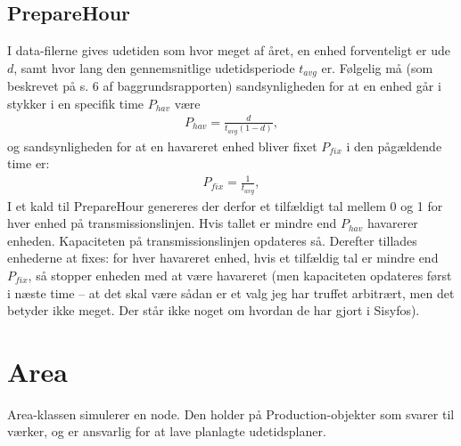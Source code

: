 \documentclass{article}
\begin{document}
\subsection{PrepareHour} \label{sec:prepLine}
I data-filerne gives udetiden som hvor meget af året, en enhed forventeligt er ude $d$, samt hvor lang den gennemsnitlige udetidsperiode $t_{avg}$ er. Følgelig må (som beskrevet på s. 6 af baggrundsrapporten) sandsynligheden for at en enhed går i stykker i en specifik time $P_{hav}$ være
\begin{align}
    P_{hav} = \frac{d}{t_{avg}(1-d)},
\end{align}
og sandsynligheden for at en havareret enhed bliver fixet $P_{fix}$ i den pågældende time er:
\begin{align}
    P_{fix} = \frac{1}{t_{avg}},
\end{align}
I et kald til PrepareHour genereres der derfor et tilfældigt tal mellem 0 og 1 for hver enhed på transmissionslinjen. Hvis tallet er mindre end $P_{hav}$ havarerer enheden. Kapaciteten på transmissionslinjen opdateres så. Derefter tillades enhederne at fixes: for hver havareret enhed, hvis et tilfældig tal er mindre end $P_{fix}$, så stopper enheden med at være havareret (men kapaciteten opdateres først i næste time -- at det skal være sådan er et valg jeg har truffet arbitrært, men det betyder ikke meget. Der står ikke noget om hvordan de har gjort i Sisyfos).

\section{Area}
Area-klassen simulerer en node. Den holder på Production-objekter som svarer til værker, og er ansvarlig for at lave planlagte udetidsplaner. 
\end{document}
